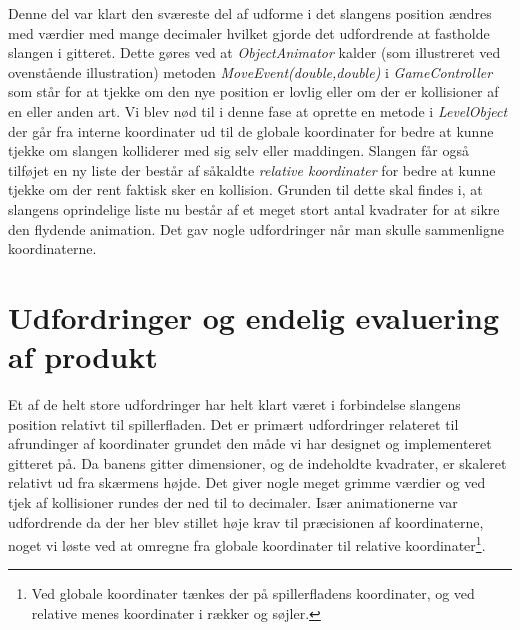 \documentclass[]{article}
\begin{document}
	Denne del var klart den sværeste del af udforme i det slangens position ændres med værdier med mange decimaler hvilket gjorde det udfordrende at fastholde slangen i gitteret. Dette gøres ved at \textit{ObjectAnimator} kalder (som illustreret ved ovenstående illustration) metoden \textit{MoveEvent(double,double)} i \textit{GameController} som står for at tjekke om den nye position er lovlig eller om der er kollisioner af en eller anden art. Vi blev nød til i denne fase at oprette en metode i \textit{LevelObject} der går fra interne koordinater ud til de globale koordinater for bedre at kunne tjekke om slangen kolliderer med sig selv eller maddingen. Slangen får også tilføjet en ny liste der består af såkaldte \textit{relative koordinater} for bedre at kunne tjekke om der rent faktisk sker en kollision. Grunden til dette skal findes i, at slangens oprindelige liste nu består af et meget stort antal kvadrater for at sikre den flydende animation. Det gav nogle udfordringer når man skulle sammenligne koordinaterne.\\
	

\section{Udfordringer og endelig evaluering af produkt}

Et af de helt store udfordringer har helt klart været i forbindelse slangens position relativt til spillerfladen. Det er primært udfordringer relateret til afrundinger af koordinater grundet den måde vi har designet og implementeret gitteret på. Da banens gitter dimensioner, og de indeholdte kvadrater, er skaleret relativt ud fra skærmens højde. Det giver nogle meget grimme værdier og ved tjek af kollisioner rundes der ned til to decimaler. Især animationerne var udfordrende da der her blev stillet høje krav til præcisionen af koordinaterne, noget vi løste ved at omregne fra globale koordinater til relative koordinater\footnote{Ved globale koordinater tænkes der på spillerfladens koordinater, og ved relative menes koordinater i rækker og søjler.}.
\end{document}
